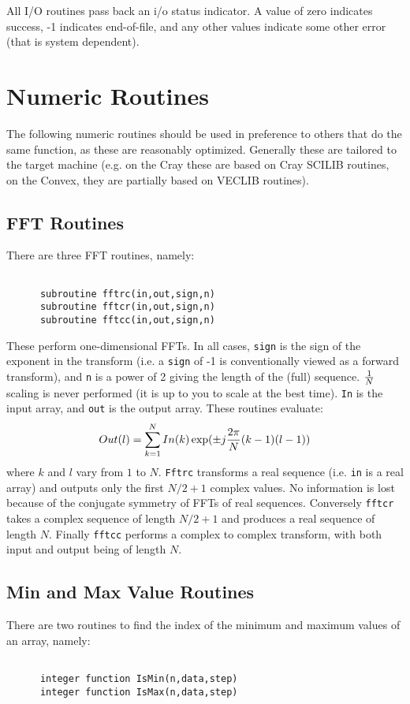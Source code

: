 All I/O routines pass back an i/o status indicator. A value of zero
indicates success, -1 indicates end-of-file, and any other values indicate
some other error (that is system dependent).

\section{Numeric Routines}
The following numeric routines should be used in preference to others that do
the same function, as these are reasonably optimized. Generally these are
tailored to the target machine (e.g. on the Cray these are
based on Cray SCILIB routines, on the Convex, they are partially based
on VECLIB routines).
\subsection{FFT Routines}
There are three FFT routines, namely:
\begin{verbatim}

      subroutine fftrc(in,out,sign,n)
      subroutine fftcr(in,out,sign,n)
      subroutine fftcc(in,out,sign,n)

\end{verbatim}
These perform one-dimensional FFTs. In all cases, {\tt sign} is the sign
of the exponent in the transform (i.e. a {\tt sign} of -1 is conventionally
viewed as a forward transform), and {\tt n} is a power of 2 giving the
length of the (full) sequence. ${1\over N}$ scaling is never performed
(it is up to you to scale at the best time). {\tt In} is the input
array, and {\tt out} is the output array. These routines
evaluate:
\[
Out(l)=\sum_{k=1}^N In(k)\exp(\pm j {2\pi\over N} (k-1)(l-1))
\]
where $k$ and $l$ vary from $1$ to $N$.
{\tt Fftrc} transforms a real
sequence (i.e. {\tt in} is a real array) and outputs only the first $N/2 + 1$
complex values. No information is lost because of the conjugate
symmetry of FFTs of real sequences. Conversely {\tt fftcr} takes a
complex sequence of length $N/2+1$ and produces a real sequence of length $N$.
Finally {\tt fftcc} performs a complex to complex transform, with
both input and output being of length $N$.

\subsection{Min and Max Value Routines}
There are two routines to find the index of the minimum and maximum values
of an array, namely:
\begin{verbatim}

      integer function IsMin(n,data,step)
      integer function IsMax(n,data,step)

\end{verbatim}

